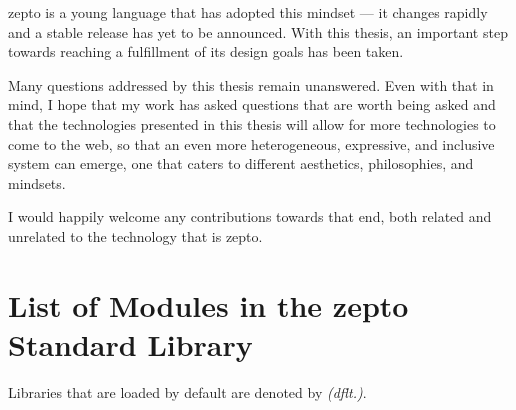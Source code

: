 \documentclass[oneside,11pt,xetex]{scrbook}
\begin{document}
zepto is a young language that has adopted this mindset ---
it changes rapidly and a stable release has yet to be announced.
With this thesis, an important step towards reaching a fulfillment
of its design goals has been taken.

Many questions addressed by this thesis remain unanswered.
Even with that in mind, I hope that my work has asked
questions that are worth being asked and that the technologies
presented in this thesis will allow for more technologies to
come to the web, so that an even more heterogeneous,
expressive, and inclusive system can emerge, one that
caters to different aesthetics, philosophies, and mindsets.

I would happily welcome any contributions towards that
end, both related and unrelated to the technology
that is zepto.



\appendix

\chapter{List of Modules in the zepto Standard Library}
\label{app:stdlib}

Libraries that are loaded by default are denoted by \textit{(dflt.)}.
\end{document}
